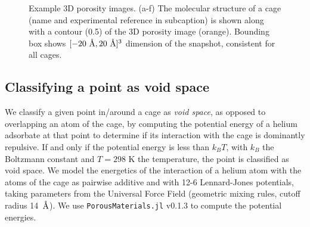 \documentclass[journal=jacsat,manuscript=article,layout=traditional]{achemso}
\newcommand{\angstrom}{\mbox{\normalfont\AA}}
\begin{document}
\begin{figure}
	\caption{Example 3D porosity images. {\color{red} (a-f)} The molecular structure of a cage {\color{red} (name and experimental reference in subcaption)} is shown along with a contour (0.5) of the 3D porosity image (orange). Bounding box shows $[-20 \text{ } \angstrom, 20 \text{ } \angstrom]^3$ dimension of the snapshot, consistent for all cages.
	} \label{fig:raw3Dimages}
\end{figure}


\subsection{Classifying a point as void space} We classify a given point in/around a cage as \emph{void space}, as opposed to overlapping an atom of the cage, by computing the potential energy of a helium adsorbate at that point to determine if its interaction with the cage is dominantly repulsive. If and only if the potential energy is less than $k_BT$, with $k_B$ the Boltzmann constant and $T=298$ K the temperature, the point is classified as void space. We model the energetics of the interaction of a helium atom with the atoms of the cage as pairwise additive and with 12-6 Lennard-Jones potentials, taking parameters from the Universal Force Field \cite{rappe1992uff} (geometric mixing rules, cutoff radius 14~$\angstrom$). We use \texttt{PorousMaterials.jl} v0.1.3 \cite{PorousMaterialsJL} to compute the potential energies.
\end{document}
